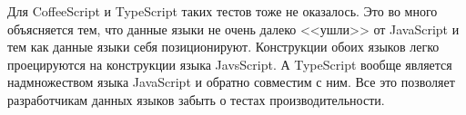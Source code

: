 Для CoffeeScript и TypeScript таких тестов тоже не оказалось. Это во много объясняется тем, что данные языки не очень далеко <<ушли>> от JavaScript и тем как данные языки себя позиционируют. Конструкции обоих языков легко проецируются на конструкции языка JavsScript. А TypeScript вообще является надмножеством языка JavaScript и обратно совместим с ним. Все это позволяет разработчикам данных языков забыть о тестах производительности.